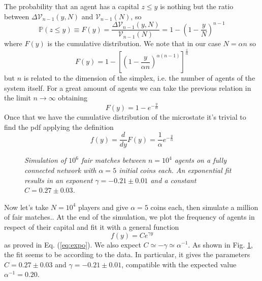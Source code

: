 The probability that an agent has a capital $z \leq y$ is nothing but the ratio between $\Delta\mathcal{V}_{n-1}\left(y, N\right)$ and $\mathcal{V}_{n-1}\left(N\right)$, so
\begin{equation*}
    \mathbb{P}\left(z \leq y\right) \equiv F(y) = \frac{\Delta\mathcal{V}_{n-1}\left(y, N\right)}{\mathcal{V}_{n-1}\left(N\right)} = 1 - \left(1 - \frac{y}{N}\right)^{n-1}
\end{equation*}
where $F(y)$ is the cumulative distribution.
We note that in our case $N=\alpha n$ so
\begin{equation*}
    F(y) =  1 - \left[\left(1 - \frac{y}{\alpha n}\right)^{\alpha\left(n - 1\right)}\right]^\frac{1}{\alpha}
\end{equation*}
but $n$ is related to the dimension of the simplex, i.e. the number of agents of the system itself.
For a great amount of agents we can take the previous relation in the limit $n\to\infty$ obtaining
\begin{equation*}
    F(y) = 1 - e^{-\frac{y}{\alpha}}
\end{equation*}
Once that we have the cumulative distribution of the microstate it's trivial to find the pdf applying the definition
\begin{equation}
    f(y) = \frac{d}{dy}F(y) = \frac{1}{\alpha} e^{-\frac{y}{\alpha}}
    \label{eq:expo}
\end{equation}

\begin{figure}[ht!]
    \centering
    \scalebox{.7}{}
    \caption{\emph{Simulation of $10^6$ fair matches between $n = 10^4$ agents on a fully connected network with $\alpha = 5$ initial coins each. 
                    An exponential fit results in an exponent $\gamma = -0.21 \pm 0.01$ and a constant $C = 0.27 \pm 0.03$.}}
    \label{fig:expo}
\end{figure}
Now let's take $N = 10^4$ players and give $\alpha = 5$ coins each, then simulate a million of fair matches..
At the end of the simulation, we plot the frequency of agents in respect of their capital and fit \cite{root} it with a general function 
\begin{equation}
    f(y) = Ce^{\gamma y}
    \label{eq:generalExpo}
\end{equation}
as proved in Eq. (\ref{eq:expo}).
We  also expect $C \simeq -\gamma \simeq \alpha^{-1}$.
As shown in Fig. \ref{fig:expo}, the fit seems to be according to the data.
In particular, it gives the parameters $C = 0.27 \pm 0.03$ and $\gamma = -0.21 \pm 0.01$, compatible with the expected value $\alpha^{-1} = 0.20$.
